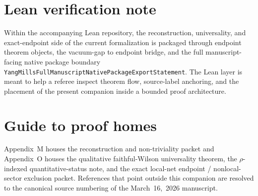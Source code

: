 \documentclass[preprint,aip,jmp,amsmath,amssymb,nofootinbib]{revtex4-2}
\begin{document}
\begin{abstract}
This companion is the proof home for the endpoint packet of the theorem-level local-net / vacuum-sector claim. It proves the Euclidean OS dossier, Wightman--Haag--Kastler reconstruction, field correspondence, Minkowski-gap transfer, non-triviality, the qualitative faithful-Wilson universality theorem, and the exact bounded-region local-net endpoint. Throughout, the theorem-level object is the local gauge-invariant sharp-local net generated by flowed curvature composites together with its OS/Wightman vacuum representation; within the admissible gradient-flow renormalization class and after coherent normalization, faithful Wilson regularizations yield the same continuum local theory, while the explicit Route~1 quantitative ledger remains $\rho$-indexed. Extended-support line/surface sectors and other nonlocal sector data remain outside the theorem-level claim. External theorem and appendix references are resolved to the canonical source numbering so that the appendix text can be read in the same numbering regime as the original manuscript. The accompanying Lean repository supplies a checkable manuscript-facing route map for this endpoint packet within the full proof architecture.
\end{abstract}
\maketitle
\section*{Lean verification note}
Within the accompanying Lean repository, the reconstruction, universality, and
exact-endpoint side of the current formalization is packaged through endpoint
theorem objects, the vacuum-gap to endpoint bridge, and the full
manuscript-facing native package boundary
\texttt{YangMillsFullManuscriptNativePackageExportStatement}. The Lean layer is
meant to help a referee inspect theorem flow, source-label anchoring, and the
placement of the present companion inside a bounded proof architecture.

\section*{Guide to proof homes}
Appendix~M houses the reconstruction and non-triviality packet and Appendix~O houses the qualitative faithful-Wilson universality theorem, the $\rho$-indexed quantitative-status note, and the exact local-net endpoint / nonlocal-sector exclusion packet. References that point outside this companion are resolved to the canonical source numbering of the March~16,~2026 manuscript.
\end{document}
